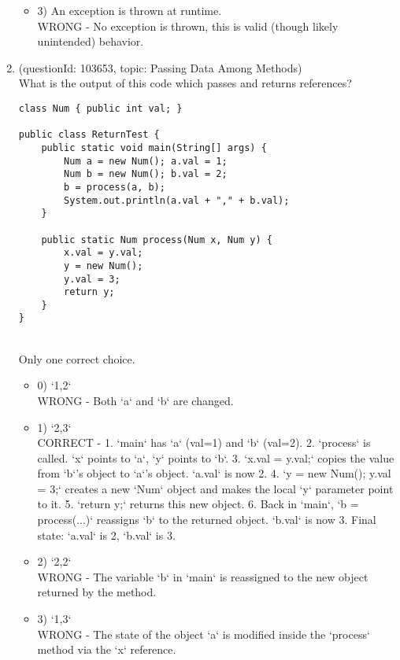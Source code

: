 \documentclass[12pt]{article}
\begin{document}
\begin{enumerate}[label=(\arabic*)]
\begin{itemize}
\item 3) An exception is thrown at runtime.
 \\ 
WRONG - No exception is thrown, this is valid (though likely unintended) behavior.

\end{itemize}
\item (questionId: 103653, topic: Passing Data Among Methods) \\ 
What is the output of this code which passes and returns references?
\begin{verbatim}
class Num { public int val; }

public class ReturnTest {
    public static void main(String[] args) {
        Num a = new Num(); a.val = 1;
        Num b = new Num(); b.val = 2;
        b = process(a, b);
        System.out.println(a.val + "," + b.val);
    }

    public static Num process(Num x, Num y) {
        x.val = y.val;
        y = new Num();
        y.val = 3;
        return y;
    }
}
\end{verbatim}
\\ \noindent Only one correct choice. 
\begin{itemize}
\item 0) `1,2`
 \\ 
WRONG - Both `a` and `b` are changed.

\item 1) `2,3`
 \\ 
CORRECT - 1. `main` has `a` (val=1) and `b` (val=2). 2. `process` is called. `x` points to `a`, `y` points to `b`. 3. `x.val = y.val;` copies the value from `b`'s object to `a`'s object. `a.val` is now 2. 4. `y = new Num(); y.val = 3;` creates a new `Num` object and makes the local `y` parameter point to it. 5. `return y;` returns this new object. 6. Back in `main`, `b = process(...)` reassigns `b` to the returned object. `b.val` is now 3. Final state: `a.val` is 2, `b.val` is 3.

\item 2) `2,2`
 \\ 
WRONG - The variable `b` in `main` is reassigned to the new object returned by the method.

\item 3) `1,3`
 \\ 
WRONG - The state of the object `a` is modified inside the `process` method via the `x` reference.


\end{itemize}
\end{enumerate}
\end{document}
